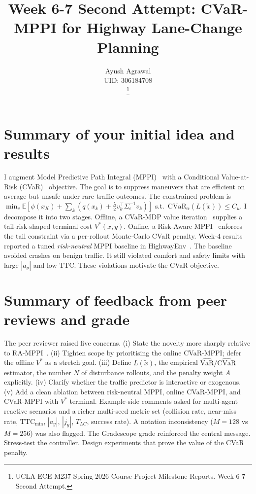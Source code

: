 \documentclass[letterpaper, 10 pt, conference]{ieeeconf}  %
\title{\LARGE \bf
Week 6-7 Second Attempt: CVaR-MPPI for Highway Lane-Change Planning}
\author{\parbox{4 in}{\centering Ayush Agrawal\\ UID: 306184708}
\thanks{UCLA ECE M237 Spring 2026 Course Project Milestone Reports. Week 6-7 Second Attempt.}
}
\begin{document}
\maketitle

\section{Summary of your initial idea and results}
I augment Model Predictive Path Integral (MPPI)~\cite{mppi} with a Conditional Value-at-Risk (CVaR)~\cite{rockafellar} objective. The goal is to suppress maneuvers that are efficient on average but unsafe under rare traffic outcomes. The constrained problem is $\min_{v}\mathbb{E}[\phi(x_K)+\sum_{k}(q(x_k)+\tfrac{\lambda}{2}v_k^{\!\top}\Sigma_\epsilon^{-1}v_k)]$ s.t.\ $\mathrm{CVaR}_\alpha(L(\tilde x))\!\le\!C_u$. I decompose it into two stages. Offline, a CVaR-MDP value iteration~\cite{chow_cvarmdp} supplies a tail-risk-shaped terminal cost $V^{*}(x,y)$. Online, a Risk-Aware MPPI~\cite{ramppi} enforces the tail constraint via a per-rollout Monte-Carlo CVaR penalty. Week-4 results reported a tuned \emph{risk-neutral} MPPI baseline in HighwayEnv~\cite{highwayenv}. The baseline avoided crashes on benign traffic. It still violated comfort and safety limits with large $|a_y|$ and low $\mathrm{TTC}$. These violations motivate the CVaR objective.

\section{Summary of feedback from peer reviews and grade}
The peer reviewer raised five concerns. (i) State the novelty more sharply relative to RA-MPPI~\cite{ramppi}. (ii) Tighten scope by prioritising the online CVaR-MPPI; defer the offline $V^{*}$ as a stretch goal. (iii) Define $L(\tilde x)$, the empirical $\widehat{\mathrm{VaR}}/\widehat{\mathrm{CVaR}}$ estimator, the number $N$ of disturbance rollouts, and the penalty weight $A$ explicitly. (iv) Clarify whether the traffic predictor is interactive or exogenous. (v) Add a clean ablation between risk-neutral MPPI, online CVaR-MPPI, and CVaR-MPPI with $V^{*}$ terminal. Example-side comments asked for multi-agent reactive scenarios and a richer multi-seed metric set (collision rate, near-miss rate, $\mathrm{TTC}_{\min}$, $|a_y|$, $|j_y|$, $T_{LC}$, success rate). A notation inconsistency ($M\!=\!128$ vs $M\!=\!256$) was also flagged. The Gradescope grade reinforced the central message. Stress-test the controller. Design experiments that prove the value of the CVaR penalty.
\end{document}
